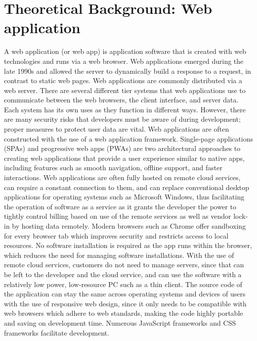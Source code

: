 \documentclass[12pt,a4paper]{report}
\begin{document}
\section{Theoretical Background: Web application}
A web application (or web app) is application software that is created with web technologies and runs via a web browser. Web applications emerged during the late 1990s and allowed the server to dynamically build a response to a request, in contrast to static web pages. 
Web applications are commonly distributed via a web server. There are several different tier systems that web applications use to communicate between the web browsers, the client interface, and server data. Each system has its own uses as they function in different ways. However, there are many security risks that developers must be aware of during development; proper measures to protect user data are vital.
Web applications are often constructed with the use of a web application framework. Single-page applications (SPAs) and progressive web apps (PWAs) are two architectural approaches to creating web applications that provide a user experience similar to native apps, including features such as smooth navigation, offline support, and faster interactions.
Web applications are often fully hosted on remote cloud services, can require a constant connection to them, and can replace conventional desktop applications for operating systems such as Microsoft Windows, thus facilitating the operation of software as a service as it grants the developer the power to tightly control billing based on use of the remote services as well as vendor lock-in by hosting data remotely. Modern browsers such as Chrome offer sandboxing for every browser tab which improves security and restricts access to local resources. No software installation is required as the app runs within the browser, which reduces the need for managing software installations. With the use of remote cloud services, customers do not need to manage servers, since that can be left to the developer and the cloud service, and can use the software with a relatively low power, low-resource PC such as a thin client. The source code of the application can stay the same across operating systems and devices of users with the use of responsive web design, since it only needs to be compatible with web browsers which adhere to web standards, making the code highly portable and saving on development time. Numerous JavaScript frameworks and CSS frameworks facilitate development.
\end{document}
